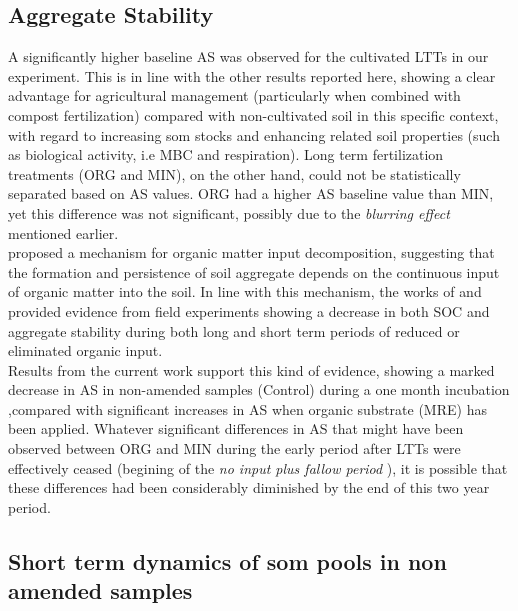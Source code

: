 	\subsection{Aggregate Stability}
	A significantly higher baseline AS was observed for the cultivated LTTs in our experiment. This is in line with the other results reported here, showing a clear advantage for agricultural management (particularly when combined with compost fertilization) compared with non-cultivated soil in this specific context, with regard to increasing \gls{som} stocks and enhancing related soil properties (such as biological activity, i.e MBC and respiration). Long term fertilization treatments (ORG and MIN), on the other hand, could not be statistically separated based on AS values. ORG had a higher AS baseline value than MIN, yet this difference was not significant, possibly due to the \textit{blurring effect} mentioned earlier. \\
	\citep{golchin1994} proposed a mechanism for organic matter input decomposition, suggesting that the formation and persistence of soil aggregate depends on the continuous input of organic matter into the soil. In line with this mechanism, the works of \citep{li2007} and \citep{redmile-gordon2020} provided evidence from field experiments showing a decrease in both SOC and aggregate stability during both long and short term periods of reduced or eliminated organic input.\\
	Results from the current work support this kind of evidence, showing  a marked decrease in AS in non-amended samples (Control) during a one month incubation ,compared with significant increases in AS when organic substrate (MRE) has been applied.
	Whatever significant differences in AS that might have been observed between ORG and MIN during the early period after LTTs were  effectively ceased (begining of the \textit{no input plus fallow period} ), it is  possible that these differences had been considerably diminished by the end of this two year period.\\

	\subsection{Short term dynamics of \gls{som} pools in non amended samples}\hypertarget{subsection_4.2.2}{}

